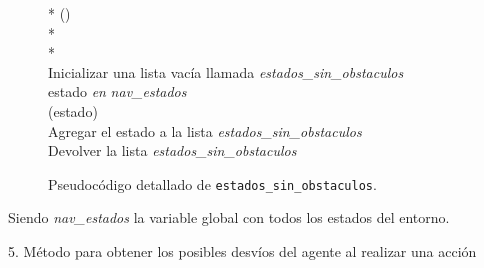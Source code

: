 \documentclass[conference,a4paper]{IEEEtran}
\begin{document}
\begin{figure}[h]
  \begin{pseudo}*
    () \\*
     \\*
    \\
    Inicializar una lista vacía llamada \textit{estados\_sin\_obstaculos} \\
     estado \textit{en} \textit{nav\_estados}  \\
    \>  (estado)  \\
    \> \> Agregar el estado a la lista \textit{estados\_sin\_obstaculos} \\
    Devolver la lista \textit{estados\_sin\_obstaculos}
  \end{pseudo}
  \caption{Pseudocódigo detallado de \texttt{estados\_sin\_obstaculos}.}
  \label{fig:estados_sin_obstaculos}
\end{figure}

Siendo \textit{nav\_estados} la variable global con todos los estados del entorno.\newline

5. Método para obtener los posibles desvíos del agente al realizar una acción
\end{document}
